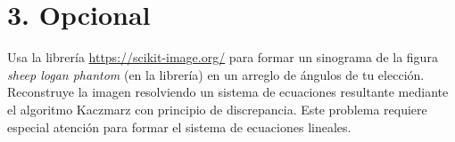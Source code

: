\documentclass[12pt,spanish,mexico]{article}
\numberwithin{equation}{section}
\theoremstyle{definition}
\theoremstyle{remark}
\begin{document}
\section*{3. Opcional}

Usa la librería \url{https://scikit-image.org/} para formar un sinograma de la figura \textit{sheep logan phantom} (en la librería) en un arreglo de ángulos de tu elección. Reconstruye la imagen resolviendo un sistema de ecuaciones resultante mediante el algoritmo Kaczmarz con principio de discrepancia. Este problema requiere especial atención para formar el sistema de ecuaciones lineales.

\vspace{0.5cm}
\end{document}
